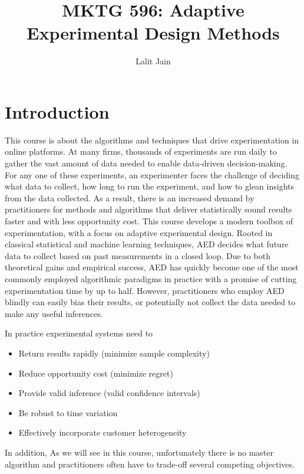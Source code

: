 \documentclass[11pt]{article}
\title{MKTG 596: Adaptive Experimental Design Methods}
\author{Lalit Jain}
\newcommand{\1}{\mathbf{1}}
\begin{document}
\maketitle

\section{Introduction}

This course is about the algorithms and techniques that drive experimentation in online platforms. At many firms, thousands of experiments are run daily to gather the vast amount of data needed to enable data-driven decision-making. For any one of these experiments, an experimenter faces the challenge of deciding what data to collect, how long to run the experiment, and how to glean insights from the data collected. As a result, there is an increased demand by practitioners for methods and algorithms that deliver statistically sound results faster and with less opportunity cost. This course develops a modern toolbox of experimentation, with a focus on adaptive experimental design. Rooted in classical statistical and machine learning techniques, AED decides what future data to collect based on past measurements in a closed loop. Due to both theoretical gains and empirical success, AED has quickly become one of the most commonly employed algorithmic paradigms in practice with a promise of cutting experimentation time by up to half. However, practitioners who employ AED blindly can easily bias their results, or potentially not collect the data needed to make any useful inferences.  

In practice experimental systems need to 
\begin{itemize}
    \item Return results rapidly (minimize sample complexity)
    \item Reduce opportunity cost (minimize regret)
    \item Provide valid inference (valid confidence intervals)
    \item Be robust to time variation
    \item Effectively incorporate customer heterogeneity
\end{itemize}
In addition, 
As we will see in this course, unfortunately there is no master algorithm and practitioners often have to trade-off several competing objectives. 
\end{document}
